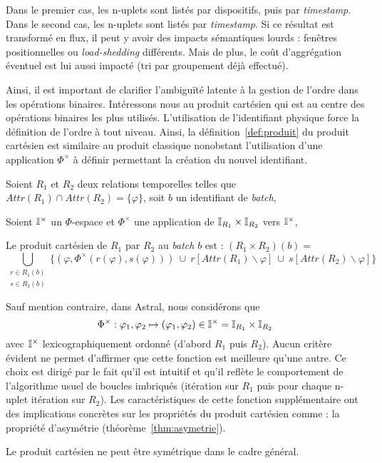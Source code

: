 \begin{example}
Dans le premier cas, les n-uplets sont listés par dispositifs, puis par \textit{timestamp}. Dans le second cas, les n-uplets sont listés par \textit{timestamp}. Si ce résultat est transformé en flux, il peut y avoir des impacts sémantiques lourds : fenêtres positionnelles ou \textit{load-shedding} différents. Mais de plus, le coût d'aggrégation éventuel est lui aussi impacté (tri par groupement déjà effectué).
\end{example}

Ainsi, il est important de clarifier l'ambiguïté latente à la gestion de l'ordre dans les opérations binaires. Intéressons nous au produit cartésien qui est au centre des opérations binaires les plus utilisés. L'utilisation de l'identifiant physique force la définition de l'ordre à tout niveau. Ainsi, la définition~\ref{def:produit} du produit cartésien est similaire au produit classique nonobstant l'utilisation d'une application $\Phi^\times$ à définir permettant la création du nouvel identifiant.
\begin{defi}\label{def:produit}
Soient $R_1$ et $R_2$ deux relations temporelles telles que $Attr(R_1) \cap Attr(R_2) = \{\varphi\}$, soit $b$ un identifiant de \textit{batch},

Soient $\mathbb{I}^{\times}$ un $\Phi$-espace et $\Phi^\times$ une application de $\mathbb{I}_{R_1}\times\mathbb{I}_{R_2}$ vers $\mathbb{I}^\times$,

Le produit cartésien de $R_1$ par $R_2$ au \textit{batch} $b$ est : $(R_1\times R_2)(b)=$
$$\bigcup_{\begin{array}{c}  r \in R_1(b)\\ s \in R_2(b)\end{array}} \{(\varphi, \Phi^\times(r(\varphi), s(\varphi))) \ \cup \ r[Attr(R_1)\backslash \varphi]\ \cup\ s[Attr(R_2)\backslash \varphi]\}$$
\end{defi}

Sauf mention contraire, dans Astral, nous considérons que $$\Phi^\times : \varphi_1, \varphi_2 \mapsto (\varphi_1,\varphi_2)\in \mathbb{I}^\times=\mathbb{I}_{R_1}\times \mathbb{I}_{R_2}$$ avec $\mathbb{I}^\times$ lexicographiquement ordonné (d'abord $R_1$ puis $R_2$). Aucun critère évident ne permet d'affirmer que cette fonction est meilleure qu'une autre. Ce choix est dirigé par le fait qu'il est intuitif et qu'il reflète le comportement de l'algorithme usuel de boucles imbriqués (itération sur $R_1$ puis pour chaque n-uplet itération sur $R_2$). Les caractéristiques de cette fonction supplémentaire ont des implications concrètes sur les propriétés du produit cartésien comme : la propriété d'asymétrie (théorème~\ref{thm:asymetrie}). 
\begin{thm}\label{thm:asymetrie}
    Le produit cartésien ne peut être symétrique dans le cadre général.
\end{thm}

